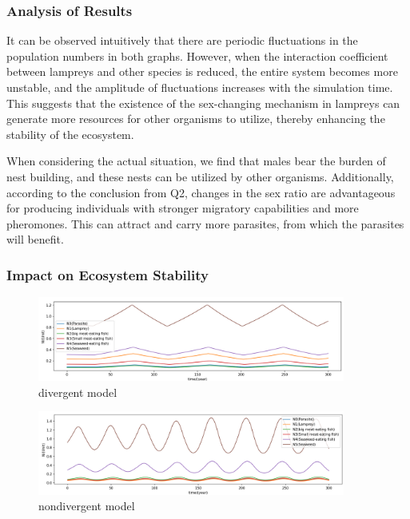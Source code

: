 \documentclass[12pt]{article}
\begin{document}
\subsubsection{Analysis of Results}

It can be observed intuitively that there are periodic fluctuations in the population numbers in
both graphs. However, when the interaction coefficient between lampreys and other species is
reduced, the entire system becomes more unstable, and the amplitude of fluctuations increases
with the simulation time. This suggests that the existence of the sex-changing mechanism in
lampreys can generate more resources for other organisms to utilize, thereby enhancing the
stability of the ecosystem.

When considering the actual situation, we find that males bear the burden of nest building, and
these nests can be utilized by other organisms. Additionally, according to the conclusion
from Q2, changes in the sex ratio are advantageous for producing individuals with stronger
migratory capabilities and more pheromones. This can attract and carry more parasites, from
which the parasites will benefit.

\subsubsection{Impact on Ecosystem Stability}
\begin{figure}[h]
	\centering
	\includegraphics[width=0.9\textwidth]{Q3_divergent.png}
	\caption{divergent model}
\end{figure}
\begin{figure}[h]
	\centering
	\includegraphics[width=0.9\textwidth]{Q3_nondivergence.png}
	\caption{nondivergent model}
\end{figure}
\end{document}
